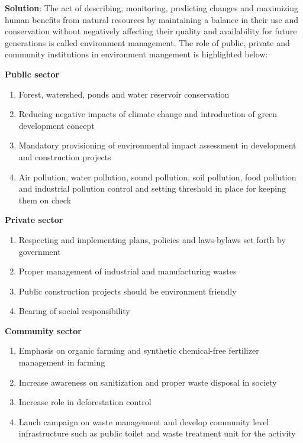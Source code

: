 \documentclass[
]{book}
\newenvironment{solution}{ {\bfseries Solution}:}{}
\begin{document}
\begin{questions}
\begin{solution}
The act of describing, monitoring, predicting changes and maximizing human benefits from natural resources by maintaining a balance in their use and conservation without negatively affecting their quality and availability for future generations is called environment management. The role of public, private and community institutions in environment mangement is highlighted below:

\textbf{Public sector}

\begin{enumerate}
\item Forest, watershed, ponds and water reservoir conservation
\item Reducing negative impacts of climate change and introduction of green development concept
\item Mandatory provisioning of environmental impact assessment in development and construction projects
\item Air pollution, water pollution, sound pollution, soil pollution, food pollution and industrial pollution control and setting threshold in place for keeping them on check
\end{enumerate}

\textbf{Private sector}

\begin{enumerate}
\item Respecting and implementing plans, policies and laws-bylaws set forth by government
\item Proper management of industrial and manufacturing wastes
\item Public construction projects should be environment friendly
\item Bearing of social responsibility
\end{enumerate}

\textbf{Community sector}
\begin{enumerate}
\item Emphasis on organic farming and synthetic chemical-free fertilizer management in farming
\item Increase awareness on sanitization and proper waste disposal in society
\item Increase role in deforestation control
\item Lauch campaign on waste management and develop community level infrastructure such as public toilet and waste treatment unit for the activity
\end{enumerate}


\end{solution}
\end{questions}
\end{document}
